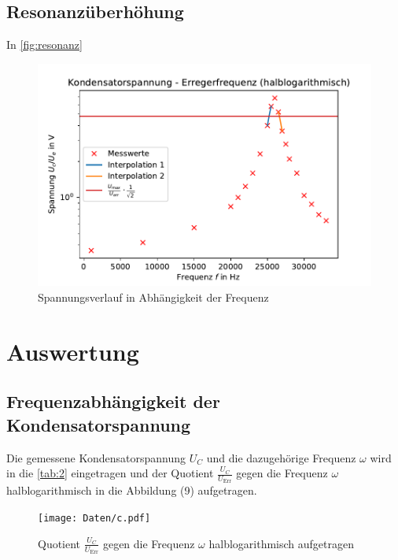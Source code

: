   \subsection{Resonanzüberhöhung}
  In \autoref{fig:resonanz}
  \begin{figure}
    \centering
    \includegraphics{frequenz.pdf}
    \caption{Spannungsverlauf in Abhängigkeit der Frequenz}
    \label{fig:resonanz}
  \end{figure}
  \section{Auswertung}













\subsection{Frequenzabhängigkeit der Kondensatorspannung}

Die gemessene Kondensatorspannung $U_C$ und die dazugehörige Frequenz $\omega$ wird in die \autoref{tab:2} eingetragen und 
der Quotient $\frac{U_C}{U_\text{Err}}$ gegen die Frequenz $\omega$ halblogarithmisch in die Abbildung (9) aufgetragen.



\begin{figure}
    \centering
    \texttt{[image: Daten/c.pdf]}
    \label{fig:21}
    \caption{Quotient $\frac{U_C}{U_\text{Err}}$ gegen die Frequenz $\omega$ halblogarithmisch aufgetragen}
\end{figure}


